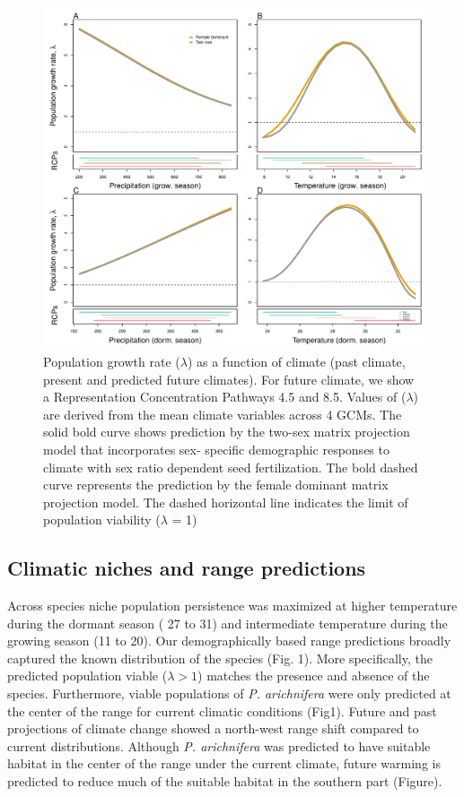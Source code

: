 \documentclass[12pt]{article}
\begin{document}
\begin{figure}[h!]
  \begin{center}
    \includegraphics[width=0.95\linewidth]{Figures/lambda_past_present_future.pdf}
  \caption{Population growth rate ($\lambda$) as a function of climate (past climate, present and predicted future climates). For future climate, we show a Representation Concentration Pathways 4.5 and 8.5. Values of ($\lambda$) are derived from the mean climate variables across 4 GCMs. The solid bold curve shows prediction by the two-sex matrix projection model that incorporates sex- specific demographic responses to climate with sex ratio dependent seed fertilization. The bold dashed curve represents the prediction by the female dominant matrix projection model. The dashed horizontal line indicates the limit of population viability ($\lambda$ = 1)}
  \label{fig:lambda}
  \end{center}
\end{figure}

\subsection*{Climatic niches and range predictions}
Across species niche population persistence was maximized at higher temperature during the dormant season ( 27 to 31) and intermediate temperature during the growing season (11 to 20). 
Our demographically based range predictions broadly captured the known distribution of the species (Fig. 1). 
More specifically, the predicted population viable ($\lambda>1$) matches the presence and absence of the species. 
Furthermore, viable populations of \emph{P. arichnifera} were only predicted at the center of the range for current climatic conditions (Fig1).
Future and past projections of climate change showed a north-west range shift compared to current distributions. 
Although \emph{P. arichnifera} was predicted to have suitable habitat in the center of the range under the current climate, future warming is predicted to reduce much of the suitable habitat in the southern part (Figure). 
\end{document}
